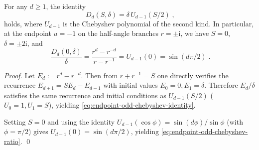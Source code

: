 \begin{proposition}\label{prop:endpoint-odd-chebyshev-identity}
For any \(d\ge 1\), the identity
\begin{equation}\label{eq:endpoint-odd-chebyshev-identity}
\boxed{\;
D_d(S,\delta)=\delta\,U_{d-1}(S/2)\; },
\end{equation}
holds, where \(U_{d-1}\) is the Chebyshev polynomial of the second kind.
In particular, at the endpoint \(u=-1\) on the half-angle branches \(r=\pm\mathrm{i}\), we have \(S=0\), \(\delta=\pm 2\mathrm{i}\), and
\begin{equation}\label{eq:endpoint-odd-chebyshev-ratio}
\boxed{\;
\frac{D_d(0,\delta)}{\delta}
=\frac{r^{d}-r^{-d}}{r-r^{-1}}
=U_{d-1}(0)
=\sin(d\pi/2)\; }.
\end{equation}
\end{proposition}
\begin{proof}
Let \(E_d:=r^{d}-r^{-d}\). Then from \(r+r^{-1}=S\) one directly verifies the recurrence
\(
E_{d+1}=SE_d-E_{d-1}
\)
with initial values \(E_0=0,E_1=\delta\).
Therefore \(E_d/\delta\) satisfies the same recurrence and initial conditions as \(U_{d-1}(S/2)\) (\(U_0=1,U_1=S\)), yielding \eqref{eq:endpoint-odd-chebyshev-identity}.
\par
Setting \(S=0\) and using the identity \(U_{d-1}(\cos\phi)=\sin(d\phi)/\sin\phi\) (with \(\phi=\pi/2\)) gives \(U_{d-1}(0)=\sin(d\pi/2)\), yielding \eqref{eq:endpoint-odd-chebyshev-ratio}. \qed
\end{proof}

